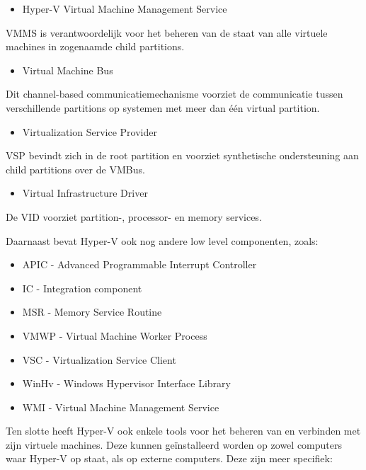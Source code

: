 \begin{itemize}[noitemsep]
	\item Hyper-V Virtual Machine Management Service
\end{itemize}

VMMS is verantwoordelijk voor het beheren van de staat van alle virtuele machines in zogenaamde child partitions.

\begin{itemize}[noitemsep]
	\item Virtual Machine Bus
\end{itemize}

Dit channel-based communicatiemechanisme voorziet de communicatie tussen verschillende partitions op systemen met meer dan één virtual partition.

\begin{itemize}[noitemsep]
	\item Virtualization Service Provider
\end{itemize}

VSP bevindt zich in de root partition en voorziet synthetische ondersteuning aan child partitions over de VMBus.

\begin{itemize}[noitemsep]
	\item Virtual Infrastructure Driver
\end{itemize}

De VID voorziet partition-, processor- en memory services.

Daarnaast bevat Hyper-V ook nog andere low level componenten, zoals:

\begin{itemize}[noitemsep]
	\item APIC - Advanced Programmable Interrupt Controller
	\item IC - Integration component
	\item MSR - Memory Service Routine
	\item VMWP - Virtual Machine Worker Process 
	\item VSC - Virtualization Service Client
	\item WinHv  - Windows Hypervisor Interface Library 
	\item WMI - Virtual Machine Management Service 
\end{itemize}

Ten slotte heeft Hyper-V ook enkele tools voor het beheren van en verbinden met zijn virtuele machines. Deze kunnen geïnstalleerd worden op zowel computers waar Hyper-V op staat, als op externe computers. Deze zijn meer specifiek:


